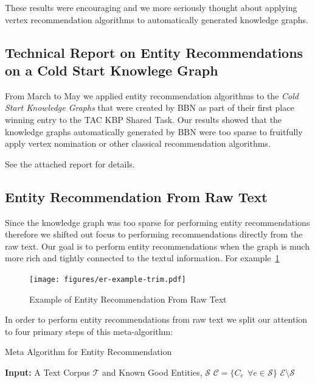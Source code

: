 \documentclass{article}
\newcommand{\ems}{$\mathcal{E} \setminus \mathcal{S}$}
\begin{document}
These results were encouraging and we more seriously thought about applying
vertex recommendation algorithms to automatically generated knowledge graphs.

\subsection{Technical Report on Entity Recommendations on a Cold Start Knowlege Graph}
\label{sec:techn-report-entity}
From March to May we applied entity recommendation algorithms to the
\textit{Cold Start Knowledge Graphs} that were created by BBN as part of
their first place winning entry to the TAC KBP Shared Task. Our results
showed that the knowledge graphs automatically generated by BBN were too
sparse to fruitfully apply vertex nomination or other classical recommendation
algorithms.

See the attached report for details.

\subsection{Entity Recommendation From Raw Text}
\label{sec:entity-recomm-from}
Since the knowledge graph was too sparse for performing entity recommendations
therefore we shifted out focus to performing recommendations directly from the
raw text. Our goal is to perform entity recommendations when the graph
is much more rich and tightly connected to the textul information. For example~\ref{fig:1}
\begin{figure}[htbp]
  \centering
  \texttt{[image: figures/er-example-trim.pdf]}
  \caption{Example of Entity Recommendation From Raw Text}
  \label{fig:1}
\end{figure}


In order to perform entity recommendations from raw text we split our attention to
four primary steps of this meta-algorithm:
\begin{algorithm}
  \label{alg:meta-algo}
  \caption{Meta Algorithm for Entity Recommendation}
  \begin{algorithmic}[1]
    \State \textbf{Input:} A Text Corpus $\mathcal{T}$ and Known Good Entities, $\mathcal{S}$
     $\mathcal{C} = \{C_e\ \ \forall e \in \mathcal{S}\}$
     \ems
  \end{algorithmic}
\end{algorithm}
\end{document}
